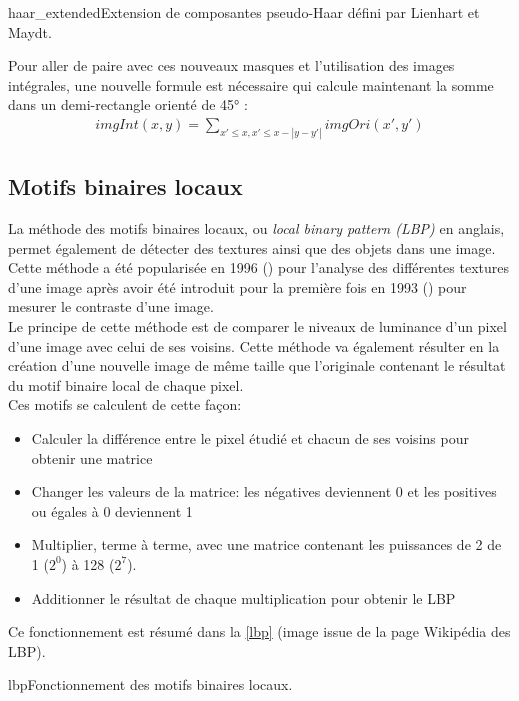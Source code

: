 \documentclass[poster]{polytech/polytech}
\begin{document}
\begin{Figure}{haar_extended}{Extension de composantes pseudo-Haar défini par Lienhart et Maydt}.
\end{Figure}

Pour aller de paire avec ces nouveaux masques et l'utilisation des images intégrales, une nouvelle formule est nécessaire qui calcule maintenant la somme dans un demi-rectangle orienté de 45° :
\begin{align*}
imgInt(x,y)= \sum \nolimits_{x' \leq x , x' \leq x - |y-y'|} imgOri(x',y')
\end{align*}


\subsection{Motifs binaires locaux}
La méthode des motifs binaires locaux, ou \textit{local binary pattern (LBP)} en anglais, permet également de détecter des textures ainsi que des objets dans une image.\\
Cette méthode a été popularisée en 1996 (\cite{lbp}) pour l'analyse des différentes textures d'une image après avoir été introduit pour la première fois en 1993 (\cite{lbp_origin}) pour mesurer le contraste d'une image.\\ 
Le principe de cette méthode est de comparer le niveaux de luminance d'un pixel d'une image avec celui de ses voisins. Cette méthode va également résulter en la création d'une nouvelle image de même taille que l'originale contenant le résultat du motif binaire local de chaque pixel.\\
Ces motifs se calculent de cette façon:
\begin{itemize}
\item Calculer la différence entre le pixel étudié et chacun de ses voisins pour obtenir une matrice
\item Changer les valeurs de la matrice: les négatives deviennent 0 et les positives ou égales à 0 deviennent 1
\item Multiplier, terme à terme, avec une matrice contenant les puissances de 2 de 1 ($2^0$) à 128 ($2^7$).
\item Additionner le résultat de chaque multiplication pour obtenir le LBP\\
\end{itemize}
Ce fonctionnement est résumé dans la \autoref{lbp} (image issue de la page Wikipédia des LBP).
\begin{Figure}{lbp}{Fonctionnement des motifs binaires locaux}.
\end{Figure}
\end{document}
